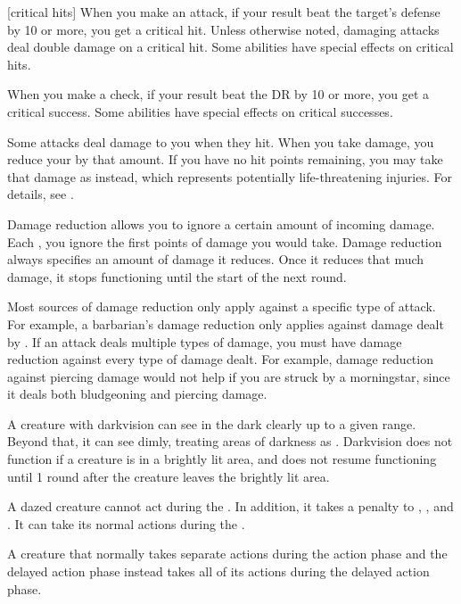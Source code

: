 [critical hits] When you make an attack, if your result beat the target's defense by 10 or more, you get a critical hit.
Unless otherwise noted, damaging attacks deal double damage on a critical hit.
Some abilities have special effects on critical hits.

 When you make a check, if your result beat the DR by 10 or more, you get a critical success.
Some abilities have special effects on critical successes.

 Some attacks deal damage to you when they hit.
When you take damage, you reduce your  by that amount.
If you have no hit points remaining, you may take that damage as  instead, which represents potentially life-threatening injuries.
For details, see .

 Damage reduction allows you to ignore a certain amount of incoming damage.
Each , you ignore the first points of damage you would take.
Damage reduction always specifies an amount of damage it reduces.
Once it reduces that much damage, it stops functioning until the start of the next round.

Most sources of damage reduction only apply against a specific type of attack.
For example, a barbarian's damage reduction only applies against damage dealt by .
If an attack deals multiple types of damage, you must have damage reduction against every type of damage dealt.
For example, damage reduction against piercing damage would not help if you are struck by a morningstar, since it deals both bludgeoning and piercing damage.

 A creature with darkvision can see in the dark clearly up to a given range.
Beyond that, it can see dimly, treating areas of darkness as .
Darkvision does not function if a creature is in a brightly lit area, and does not resume functioning until 1 round after the creature leaves the brightly lit area.

 A dazed creature cannot act during the .
In addition, it takes a  penalty to , , and .
It can take its normal actions during the .

A creature that normally takes separate actions during the action phase and the delayed action phase instead takes all of its actions during the delayed action phase.

